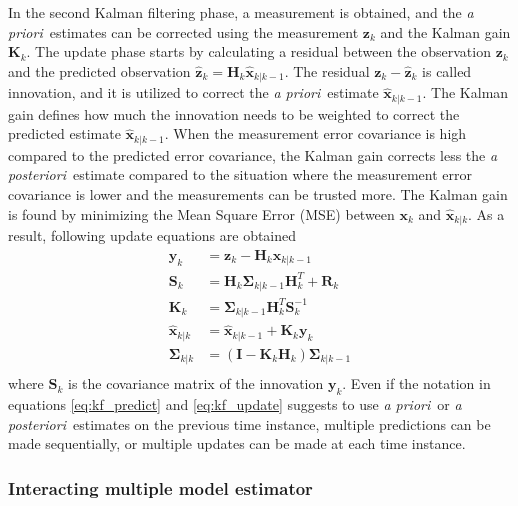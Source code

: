 \documentclass[english, 12pt, a4paper, elec, utf8, a-1b, online]{aaltothesis}
\renewcommand{\vec}[1]{\mathbf{#1}}
\newcommand{\inv}[1]{#1^{-1}}
\newcommand{\xprior}{\hat{\vec{x}}_{k|k-1}}
\newcommand{\xpost}{\hat{\vec{x}}_{k|k}}
\newcommand{\priorecov}{\boldsymbol{\Sigma}_{k|k-1}}
\newcommand{\postecov}{\boldsymbol{\Sigma}_{k|k}}
\newcommand{\prefitinnov}{\vec{y}_k}
\newcommand{\x}{\vec{x}_k}
\newcommand{\z}{\vec{z}_k}
\newcommand{\omodel}{\vec{H}_k}
\newcommand{\ocov}{\vec{R}_k}
\newcommand{\innocov}{\vec{S}_k}
\newcommand{\eye}{\vec{I}}
\newcommand{\gain}{\vec{K}_k}
\def\prior{\textit{a priori}\ }
\def\post{\textit{a posteriori}\ }
\newcommand{\zhat}{\hat{\vec{z}}_k}
\begin{document}
In the second Kalman filtering phase, a measurement is obtained, and the \prior estimates can be corrected using the measurement $\z$ and the Kalman gain $\gain$.
The update phase starts by calculating a residual between the observation $\z$ and the predicted observation $\zhat = \omodel \xprior$.
The residual $\z-\zhat$ is called innovation, and it is utilized to correct the \prior estimate $\xprior$.
The Kalman gain defines how much the innovation needs to be weighted to correct the predicted estimate $\xprior$.
When the measurement error covariance is high compared to the predicted error covariance, the Kalman gain corrects less the \post estimate compared to the situation where the measurement error covariance is lower and the measurements can be trusted more. 
The Kalman gain is found by minimizing the Mean Square Error (MSE) between $\x$ and $\xpost$.
As a result, following update equations are obtained \cite{Zarchan2000}
\begin{subequations}
\label{eq:kf_update}
\begin{align}
    \prefitinnov &= \z - \omodel \xprior \label{eq:kf_prefit_innov}\\ 
    \innocov &= \omodel \priorecov \omodel^T + \ocov \label{eq:kf_innov_cov}\\ 
    \gain &= \priorecov \omodel^T \inv{\innocov} \label{eq:kf_gain}\\ 
    \xpost &= \xprior + \gain \prefitinnov \label{eq:kf_update_x}\\ 
    \postecov &= \left( \eye - \gain \omodel \right) \priorecov  \label{eq:kf_post_error_cov}\\
\end{align}
\end{subequations}
where $\innocov$ is the covariance matrix of the innovation $\prefitinnov$. 
Even if the notation in equations \eqref{eq:kf_predict} and \eqref{eq:kf_update} suggests to use \prior or \post estimates on the previous time instance, multiple predictions can be made sequentially, or multiple updates can be made at each time instance.

\subsubsection{Interacting multiple model estimator}
\label{sec:IMM}
\end{document}
